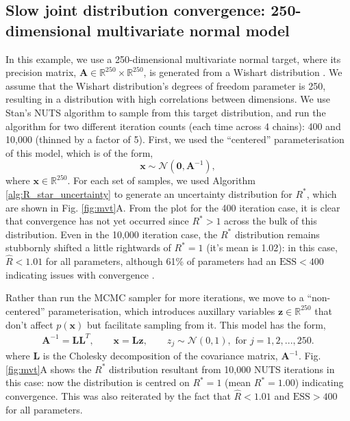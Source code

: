 \documentclass{article}
\begin{document}
\subsection{Slow joint distribution convergence: 250-dimensional multivariate normal model}\label{sec:multivariate_normal}
In this example, we use a 250-dimensional multivariate normal target, where its precision matrix, $\boldsymbol{A}\in\mathbb{R}^{250}\times\mathbb{R}^{250}$, is generated from a Wishart distribution \cite{hoffman2014no}. We assume that the Wishart distribution's degrees of freedom parameter is 250, resulting in a distribution with high correlations between dimensions. We use Stan's NUTS algorithm to sample from this target distribution, and run the algorithm for two different iteration counts (each time across 4 chains): 400 and 10,000 (thinned by a factor of 5). First, we used the ``centered'' parameterisation of this model, which is of the form,
%
\begin{equation}
\boldsymbol{x}\sim \mathcal{N}(\boldsymbol{0},\boldsymbol{A}^{-1}),
\end{equation}
%
where $\boldsymbol{x}\in\mathbb{R}^{250}$. For each set of samples, we used Algorithm \ref{alg:R_star_uncertainty} to generate an uncertainty distribution for $R^*$, which are shown in Fig. \ref{fig:mvt}A. From the plot for the 400 iteration case, it is clear that convergence has not yet occurred since $R^*>1$ across the bulk of this distribution. Even in the 10,000 iteration case, the $R^*$ distribution remains stubbornly shifted a little rightwards of $R^*=1$ (it's mean is 1.02): in this case, $\hat{R}<1.01$ for all parameters, although 61\% of parameters had an $\text{ESS}<400$ indicating issues with convergence \cite{vehtari2019rank}.

Rather than run the MCMC sampler for more iterations, we move to a ``non-centered'' parameterisation, which introduces auxillary variables $\boldsymbol{z}\in\mathbb{R}^{250}$ that don't affect $p(\boldsymbol{x})$ but facilitate sampling from it. This model has the form,
%
\begin{align}
\boldsymbol{A}^{-1} = \boldsymbol{L}\boldsymbol{L}^T,\qquad
\boldsymbol{x} = \boldsymbol{L} \boldsymbol{z},\qquad
z_j\sim \mathcal{N}(0, 1), \text{ for } j = 1,2,...,250.
\end{align}
%
where $\boldsymbol{L}$ is the Cholesky decomposition of the covariance matrix, $\boldsymbol{A}^{-1}$. Fig. \ref{fig:mvt}A shows the $R^*$ distribution resultant from 10,000 NUTS iterations in this case: now the distribution is centred on $R^*=1$ (mean $R^*=1.00$) indicating convergence. This was also reiterated by the fact that $\hat{R}<1.01$ and $\text{ESS}>400$ for all parameters.
\end{document}
